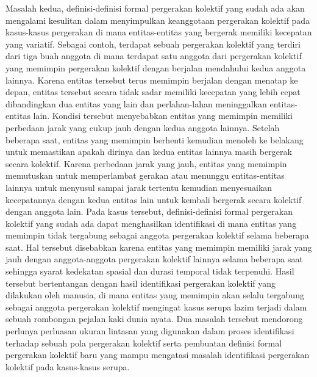 Masalah kedua, definisi-definisi formal pergerakan kolektif yang sudah ada akan mengalami kesulitan dalam menyimpulkan keanggotaan pergerakan kolektif pada kasus-kasus pergerakan di mana entitas-entitas yang bergerak memiliki kecepatan yang variatif. Sebagai contoh, terdapat sebuah pergerakan kolektif yang terdiri dari tiga buah anggota di mana terdapat satu anggota dari pergerakan kolektif yang memimpin pergerakan kolektif dengan berjalan mendahului kedua anggota lainnya. Karena entitas tersebut terus memimpin berjalan dengan menatap ke depan, entitas tersebut secara tidak sadar memiliki kecepatan yang lebih cepat dibandingkan dua entitas yang lain dan perlahan-lahan meninggalkan entitas-entitas lain. Kondisi tersebut menyebabkan entitas yang memimpin memiliki perbedaan jarak yang cukup jauh dengan kedua anggota lainnya. Setelah beberapa saat, entitas yang memimpin berhenti kemudian menoleh ke belakang untuk memastikan apakah dirinya dan kedua entitas lainnya masih bergerak secara kolektif. Karena perbedaan jarak yang jauh, entitas yang memimpin memutuskan untuk memperlambat gerakan atau menunggu entitas-entitas lainnya untuk menyusul sampai jarak tertentu kemudian menyesuaikan kecepatannya dengan kedua entitas lain untuk kembali bergerak secara kolektif dengan anggota lain. Pada kasus tersebut, definisi-definisi formal pergerakan kolektif yang sudah ada dapat menghasilkan identifikasi di mana entitas yang memimpin tidak tergabung sebagai anggota pergerakan kolektif selama beberapa saat. Hal tersebut disebabkan karena entitas yang memimpin memiliki jarak yang jauh dengan anggota-anggota pergerakan kolektif lainnya selama beberapa saat sehingga syarat kedekatan spasial dan durasi temporal tidak terpenuhi. Hasil tersebut bertentangan dengan hasil identifikasi pergerakan kolektif yang dilakukan oleh manusia, di mana entitas yang memimpin akan selalu tergabung sebagai anggota pergerakan kolektif mengingat kasus serupa lazim terjadi dalam sebuah rombongan pejalan kaki dunia nyata. Dua masalah tersebut mendorong perlunya perluasan ukuran lintasan yang digunakan dalam proses identifikasi terhadap sebuah pola pergerakan kolektif serta pembuatan definisi formal pergerakan kolektif baru yang mampu mengatasi masalah identifikasi pergerakan kolektif pada kasus-kasus serupa. 

